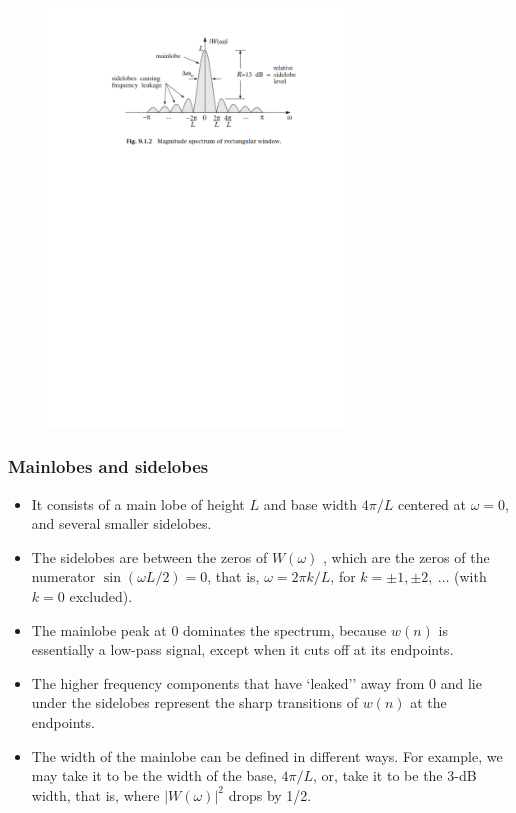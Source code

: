 \begin{frame}
\begin{figure}
  \centering
  \includegraphics[width=0.7\textwidth]{rectangularw}\\
\end{figure}
\end{frame}

\begin{frame}
\frametitle{Mainlobes and sidelobes}
\begin{itemize}
\item It consists of a \alert{main lobe} of height $L$ and base width $4\pi/L$ centered at $\omega=0$, and several smaller \alert{sidelobes}.
\item The sidelobes are between the zeros of $W(\omega)$ , which are the zeros of the numerator $\sin(\omega L/2)=0$, that is, $\omega=2\pi k/L$, for $k=\pm 1, \pm 2,\ \ldots$ (with $k=0$ excluded).
\item The mainlobe peak at $0$ dominates the spectrum, because $w(n)$ is essentially a low-pass  signal, except when it cuts off at its endpoints.
\item The higher frequency components that have `leaked'' away from $0$ and lie under the sidelobes represent the sharp transitions of $w(n)$ at the endpoints.
\item The \alert{width} of the mainlobe can be defined in different ways. For example, we may take it to be the width of the base, $4\pi/L$, or, take it to be the 3-dB width, that is, where $|W(\omega)|^{2}$ drops by 1/2.
\end{itemize}
\end{frame}

